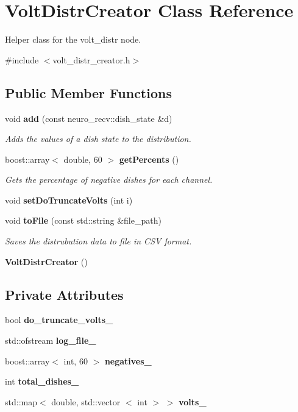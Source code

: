 \section{\-Volt\-Distr\-Creator \-Class \-Reference}
\label{classVoltDistrCreator}


\-Helper class for the volt\-\_\-distr node.  




{\ttfamily \#include $<$volt\-\_\-distr\-\_\-creator.\-h$>$}

\subsection*{\-Public \-Member \-Functions}
\begin{DoxyCompactItemize}
\item 
void {\bf add} (const neuro\-\_\-recv\-::dish\-\_\-state \&d)
\begin{DoxyCompactList}\small\item\em \-Adds the values of a dish state to the distribution. \end{DoxyCompactList}\item 
boost\-::array$<$ double, 60 $>$ {\bf get\-Percents} ()
\begin{DoxyCompactList}\small\item\em \-Gets the percentage of negative dishes for each channel. \end{DoxyCompactList}\item 
void {\bf set\-Do\-Truncate\-Volts} (int i)
\item 
void {\bf to\-File} (const std\-::string \&file\-\_\-path)
\begin{DoxyCompactList}\small\item\em \-Saves the distrubution data to file in \-C\-S\-V format. \end{DoxyCompactList}\item 
{\bf \-Volt\-Distr\-Creator} ()
\end{DoxyCompactItemize}
\subsection*{\-Private \-Attributes}
\begin{DoxyCompactItemize}
\item 
bool {\bf do\-\_\-truncate\-\_\-volts\-\_\-}
\item 
std\-::ofstream {\bf log\-\_\-file\-\_\-}
\item 
boost\-::array$<$ int, 60 $>$ {\bf negatives\-\_\-}
\item 
int {\bf total\-\_\-dishes\-\_\-}
\item 
std\-::map$<$ double, std\-::vector\*
$<$ int $>$ $>$ {\bf volts\-\_\-}
\end{DoxyCompactItemize}


